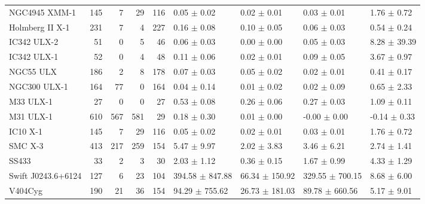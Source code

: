 \begin{tabular}{lrrrrllll}
     NGC4945 XMM-1 &  145 &   7 &   29 &   116 &     0.05 $\pm$ 0.02 &    0.02 $\pm$ 0.01 &     0.03 $\pm$ 0.01 &  1.76 $\pm$ 0.72 \\
   Holmberg II X-1 &  231 &   7 &    4 &   227 &     0.16 $\pm$ 0.08 &    0.10 $\pm$ 0.05 &     0.06 $\pm$ 0.03 &  0.54 $\pm$ 0.24 \\
       IC342 ULX-2 &   51 &   0 &    5 &    46 &     0.06 $\pm$ 0.03 &    0.00 $\pm$ 0.00 &     0.05 $\pm$ 0.03 & 8.28 $\pm$ 39.39 \\
       IC342 ULX-1 &   52 &   0 &    4 &    48 &     0.11 $\pm$ 0.06 &    0.02 $\pm$ 0.01 &     0.09 $\pm$ 0.05 &  3.67 $\pm$ 0.97 \\
         NGC55 ULX &  186 &   2 &    8 &   178 &     0.07 $\pm$ 0.03 &    0.05 $\pm$ 0.02 &     0.02 $\pm$ 0.01 &  0.41 $\pm$ 0.17 \\
      NGC300 ULX-1 &  164 &  77 &    0 &   164 &     0.04 $\pm$ 0.14 &    0.01 $\pm$ 0.02 &     0.02 $\pm$ 0.09 &  0.65 $\pm$ 2.33 \\
         M33 ULX-1 &   27 &   0 &    0 &    27 &     0.53 $\pm$ 0.08 &    0.26 $\pm$ 0.06 &     0.27 $\pm$ 0.03 &  1.09 $\pm$ 0.11 \\
         M31 ULX-1 &  610 & 567 &  581 &    29 &     0.18 $\pm$ 0.30 &    0.01 $\pm$ 0.00 &    -0.00 $\pm$ 0.00 & -0.14 $\pm$ 0.33 \\
          IC10 X-1 &  145 &   7 &   29 &   116 &     0.05 $\pm$ 0.02 &    0.02 $\pm$ 0.01 &     0.03 $\pm$ 0.01 &  1.76 $\pm$ 0.72 \\
           SMC X-3 &  413 & 217 &  259 &   154 &     5.47 $\pm$ 9.97 &    2.02 $\pm$ 3.83 &     3.46 $\pm$ 6.21 &  2.74 $\pm$ 1.41 \\
             SS433 &   33 &   2 &    3 &    30 &     2.03 $\pm$ 1.12 &    0.36 $\pm$ 0.15 &     1.67 $\pm$ 0.99 &  4.33 $\pm$ 1.29 \\
Swift J0243.6+6124 &  127 &   6 &   23 &   104 & 394.58 $\pm$ 847.88 & 66.34 $\pm$ 150.92 & 329.55 $\pm$ 700.15 &  8.68 $\pm$ 6.00 \\
           V404Cyg &  190 &  21 &   36 &   154 &  94.29 $\pm$ 755.62 & 26.73 $\pm$ 181.03 &  89.78 $\pm$ 660.56 &  5.17 $\pm$ 9.01 \\
\bottomrule
\end{tabular}
